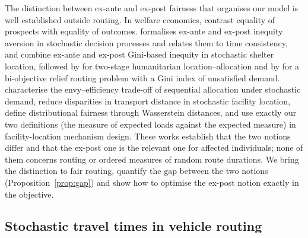 \documentclass[11pt]{article}
\theoremstyle{definition}
\begin{document}
The distinction between ex-ante and ex-post fairness that organises our model
is well established outside routing. In welfare economics,
\citet{fleurbaey2012exante} contrast equality of prospects with equality of
outcomes. \citet{gutjahr2021inequity} formalises ex-ante and ex-post
inequity aversion in stochastic decision processes and relates them to
time consistency, and \citet{mostajabdaveh2019inequity} combine ex-ante and
ex-post Gini-based inequity in stochastic shelter location, followed by
\citet{alem2022revisiting} for two-stage humanitarian location--allocation and
by \citet{mostajabdaveh2025branch} for a bi-objective relief routing problem
with a Gini index of unsatisfied demand. \citet{sinclair2023sequential}
characterise the envy--efficiency trade-off of sequential allocation under
stochastic demand, \citet{shehadeh2023reducing} reduce disparities in
transport distance in stochastic facility location,
\citet{ye2024distributionally} define distributional fairness through
Wasserstein distances, and \citet{barak2026exante} use exactly our two
definitions (the measure of expected loads against the expected measure) in
facility-location mechanism design. These works establish that the two
notions differ and that the ex-post one is the relevant one for affected
individuals; none of them concerns routing or ordered measures of random
route durations. We bring the distinction to fair routing, quantify the gap
between the two notions (Proposition~\ref{prop:gap}) and show how to optimise
the ex-post notion exactly in the objective.

\subsection{Stochastic travel times in vehicle routing}
\end{document}
